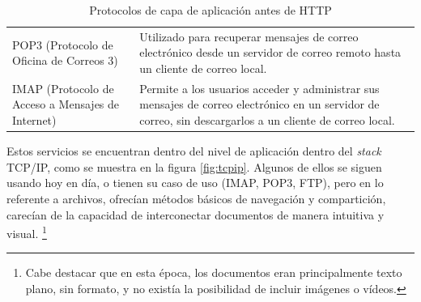 \begin{table}[h]
\begin{tabular}{>{\raggedright}m{3cm}m{10cm}}
            \addlinespace
            POP3 (Protocolo de Oficina de Correos 3)             & Utilizado para recuperar mensajes de correo electrónico desde un servidor de correo remoto hasta un cliente de correo local.                                        \\
            \addlinespace
            IMAP (Protocolo de Acceso a Mensajes de Internet)    & Permite a los usuarios acceder y administrar sus mensajes de correo electrónico en un servidor de correo, sin descargarlos a un cliente de correo local.            \\
            \bottomrule
      \end{tabular}
      \caption{Protocolos de capa de aplicación antes de HTTP}
      \label{fig:evolucion-protocolos}
\end{table}

Estos servicios se encuentran dentro del nivel de aplicación  dentro del \textit{stack} TCP/IP, como se muestra en la figura \ref{fig:tcpip}.
Algunos de ellos se siguen usando hoy en día, o tienen su caso de uso (IMAP, POP3, FTP), pero en lo referente a archivos,
ofrecían métodos básicos de navegación y compartición, carecían de la capacidad de interconectar documentos de manera intuitiva y visual.
\footnote{Cabe destacar que en esta época, los documentos eran principalmente texto plano, sin formato, y no existía la posibilidad de incluir imágenes o vídeos.}

